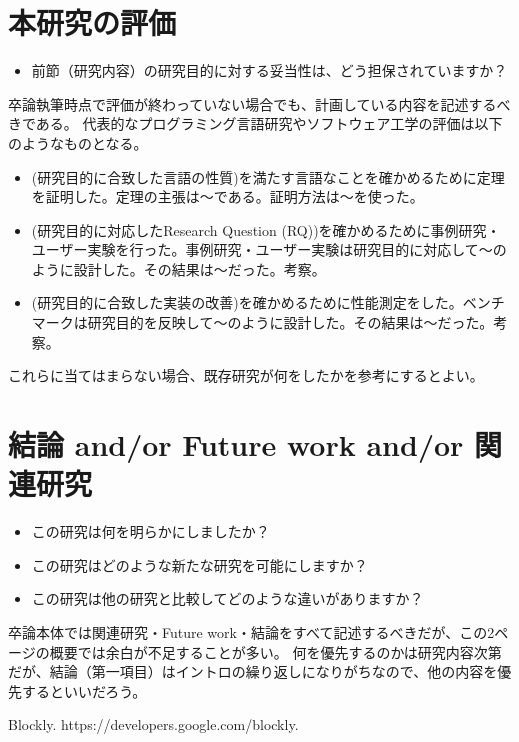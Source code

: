 \documentclass[11pt, a4paper, oneside, twocolumn]{jsarticle}
\begin{document}
\section{本研究の評価}
\begin{itemize}
\item 前節（研究内容）の研究目的に対する妥当性は、どう担保されていますか？
\end{itemize}
卒論執筆時点で評価が終わっていない場合でも、計画している内容を記述するべきである。
代表的なプログラミング言語研究やソフトウェア工学の評価は以下のようなものとなる。
\begin{itemize}
\item (研究目的に合致した言語の性質)を満たす言語なことを確かめるために定理を証明した。定理の主張は〜である。証明方法は〜を使った。
\item (研究目的に対応したResearch Question (RQ))を確かめるために事例研究・ユーザー実験を行った。事例研究・ユーザー実験は研究目的に対応して〜のように設計した。その結果は〜だった。考察。
\item (研究目的に合致した実装の改善)を確かめるために性能測定をした。ベンチマークは研究目的を反映して〜のように設計した。その結果は〜だった。考察。
\end{itemize}
これらに当てはまらない場合、既存研究が何をしたかを参考にするとよい。

\section{結論 and/or Future work and/or 関連研究}
\begin{itemize}
\item この研究は何を明らかにしましたか？
\item この研究はどのような新たな研究を可能にしますか？
\item この研究は他の研究と比較してどのような違いがありますか？
\end{itemize}
卒論本体では関連研究・Future work・結論をすべて記述するべきだが、この2ページの概要では余白が不足することが多い。
何を優先するのかは研究内容次第だが、結論（第一項目）はイントロの繰り返しになりがちなので、他の内容を優先するといいだろう。

{\scriptsize
\begin{thebibliography}{1} 
  Blockly. https://developers.google.com/blockly.
\end{thebibliography}
}
\end{document}
